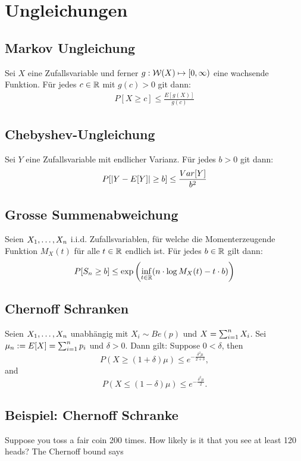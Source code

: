 \section{Ungleichungen}
\subsection{Markov Ungleichung}
Sei $X$ eine Zufallsvariable und ferner $g : \mathcal{W} (X) \mapsto [0, \infty)$ eine
wachsende Funktion. Für jedes $c \in \mathbb{R}$ mit $g (c) > 0$ git dann:
\begin{align*}
  P[X \geq c] \leq \frac{E[g (X)]}{g (c)}
\end{align*}
\subsection{Chebyshev-Ungleichung}
Sei $Y$ eine Zufallsvariable mit endlicher Varianz. Für jedes $b > 0$ git dann:
\begin{align*}
  P[\abs{Y - E[Y]} \geq b] \leq \frac{Var[Y]}{b^2}
\end{align*}


\subsection{Grosse Summenabweichung}
Seien $X_1, \dots, X_n$ i.i.d. Zufallsvariablen, für welche die
Momenterzeugende Funktion $M_X (t)$ für alle $t \in \mathbb{R}$ endlich ist. Für jedes
$b \in \mathbb{R}$ gilt dann:
\begin{align*}
  P[S_n \geq b] \leq \exp \left( \inf_{t \in \mathbb{R}}  ( n \cdot \log M_X (t) - t \cdot b ) \right)
\end{align*}

\subsection{Chernoff Schranken}
Seien $X_1, \dots, X_n$ unabhängig mit $X_i \sim Be (p)$ und $X = \sum_{i = 1}^n X_i$.
Sei $\mu_n := E[X] = \sum_{i = 1}^n p_i$ und $\delta > 0$. Dann gilt:
Suppose $0 < \delta$, then
\[ P(X \geq (1 + \delta)\mu) \leq e^{-\frac{\delta^2\mu}{2+\delta}}, \]
and
\[ P(X \leq (1 - \delta)\mu) \leq e^{-\frac{\delta^2\mu}{2}}. \]

\BoxStart{}
\subsection{Beispiel: Chernoff Schranke}
Suppose you toss a fair coin 200 times. How likely is it that you see
at least 120 heads?
The Chernoff bound says

